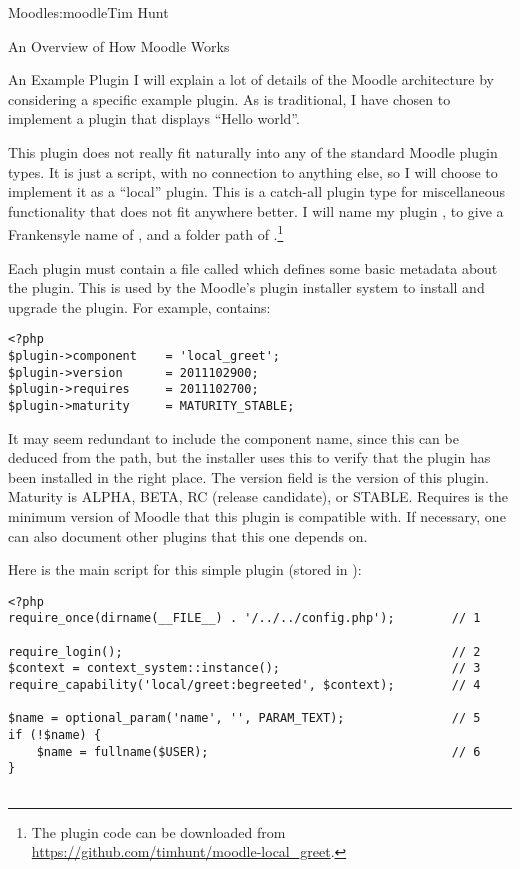 \begin{aosachapter}{Moodle}{s:moodle}{Tim Hunt}
\begin{aosasect1}{An Overview of How Moodle Works}
\begin{aosasect2}{An Example Plugin}
I will explain a lot of details of the Moodle architecture by
considering a specific example plugin. As is traditional, I have
chosen to implement a plugin that displays ``Hello world''.

This plugin does not really fit naturally into any of the standard
Moodle plugin types. It is just a script, with no connection to
anything else, so I will choose to implement it as a ``local''
plugin. This is a catch-all plugin type for miscellaneous
functionality that does not fit anywhere better. I will name my plugin
, to give a Frankensyle name of , and a
folder path of .\footnote{The plugin code can be downloaded
from \url{https://github.com/timhunt/moodle-local_greet}.}

Each plugin must contain a file called  which
defines some basic metadata about the plugin. This is used by the
Moodle's plugin installer system to install and upgrade the plugin.
For example,  contains:

\begin{verbatim}
<?php
$plugin->component    = 'local_greet';
$plugin->version      = 2011102900;
$plugin->requires     = 2011102700;
$plugin->maturity     = MATURITY_STABLE;
\end{verbatim}

It may seem redundant to include the component name, since this can be
deduced from the path, but the installer uses this to verify that the
plugin has been installed in the right place. The version field is the
version of this plugin. Maturity is ALPHA, BETA, RC (release
candidate), or STABLE. Requires is the minimum version of Moodle that
this plugin is compatible with. If necessary, one can also document
other plugins that this one depends on.

Here is the main script for this simple plugin (stored in
):

\begin{verbatim}
<?php
require_once(dirname(__FILE__) . '/../../config.php');        // 1

require_login();                                              // 2
$context = context_system::instance();                        // 3
require_capability('local/greet:begreeted', $context);        // 4

$name = optional_param('name', '', PARAM_TEXT);               // 5
if (!$name) {
    $name = fullname($USER);                                  // 6
}


\end{verbatim}
\end{aosasect2}
\end{aosasect1}
\end{aosachapter}
